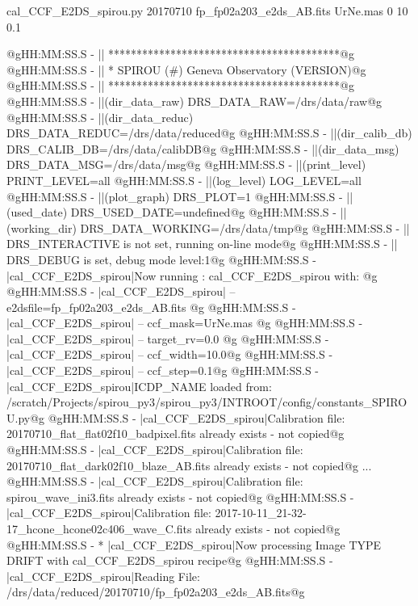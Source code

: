 \begin{cmdbox}[title={example}]
cal_CCF_E2DS_spirou.py 20170710 fp_fp02a203_e2ds_AB.fits UrNe.mas 0 10 0.1
\end{cmdbox}
\begin{cmdboxprintspecial}[fontupper=\tiny, fontlower=\tiny]
@gHH:MM:SS.S -   || *****************************************@g
@gHH:MM:SS.S -   || * SPIROU \@(#) Geneva Observatory (VERSION)@g
@gHH:MM:SS.S -   || *****************************************@g
@gHH:MM:SS.S -   ||(dir_data_raw)      DRS_DATA_RAW=/drs/data/raw@g
@gHH:MM:SS.S -   ||(dir_data_reduc)    DRS_DATA_REDUC=/drs/data/reduced@g
@gHH:MM:SS.S -   ||(dir_calib_db)      DRS_CALIB_DB=/drs/data/calibDB@g
@gHH:MM:SS.S -   ||(dir_data_msg)      DRS_DATA_MSG=/drs/data/msg@g
@gHH:MM:SS.S -   ||(print_level)       PRINT_LEVEL=all         %
@gHH:MM:SS.S -   ||(log_level)         LOG_LEVEL=all         %
@gHH:MM:SS.S -   ||(plot_graph)        DRS_PLOT=1            %
@gHH:MM:SS.S -   ||(used_date)         DRS_USED_DATE=undefined@g
@gHH:MM:SS.S -   ||(working_dir)       DRS_DATA_WORKING=/drs/data/tmp@g
@gHH:MM:SS.S -   ||                    DRS_INTERACTIVE is not set, running on-line mode@g
@gHH:MM:SS.S -   ||                    DRS_DEBUG is set, debug mode level:1@g
@gHH:MM:SS.S -   |cal_CCF_E2DS_spirou|Now running : cal_CCF_E2DS_spirou with: @g
@gHH:MM:SS.S -   |cal_CCF_E2DS_spirou|       -- e2dsfile=fp_fp02a203_e2ds_AB.fits @g
@gHH:MM:SS.S -   |cal_CCF_E2DS_spirou|       -- ccf_mask=UrNe.mas @g
@gHH:MM:SS.S -   |cal_CCF_E2DS_spirou|       -- target_rv=0.0 @g
@gHH:MM:SS.S -   |cal_CCF_E2DS_spirou|       -- ccf_width=10.0@g
@gHH:MM:SS.S -   |cal_CCF_E2DS_spirou|       -- ccf_step=0.1@g
@gHH:MM:SS.S -   |cal_CCF_E2DS_spirou|ICDP_NAME loaded from: /scratch/Projects/spirou_py3/spirou_py3/INTROOT/config/constants_SPIROU.py@g
@gHH:MM:SS.S -   |cal_CCF_E2DS_spirou|Calibration file: 20170710_flat_flat02f10_badpixel.fits already exists - not copied@g
@gHH:MM:SS.S -   |cal_CCF_E2DS_spirou|Calibration file: 20170710_flat_dark02f10_blaze_AB.fits already exists - not copied@g
...
@gHH:MM:SS.S -   |cal_CCF_E2DS_spirou|Calibration file: spirou_wave_ini3.fits already exists - not copied@g
@gHH:MM:SS.S -   |cal_CCF_E2DS_spirou|Calibration file: 2017-10-11_21-32-17_hcone_hcone02c406_wave_C.fits already exists - not copied@g
@gHH:MM:SS.S - * |cal_CCF_E2DS_spirou|Now processing Image TYPE DRIFT with cal_CCF_E2DS_spirou recipe@g
@gHH:MM:SS.S -   |cal_CCF_E2DS_spirou|Reading File: /drs/data/reduced/20170710/fp_fp02a203_e2ds_AB.fits@g

\end{cmdboxprintspecial}
